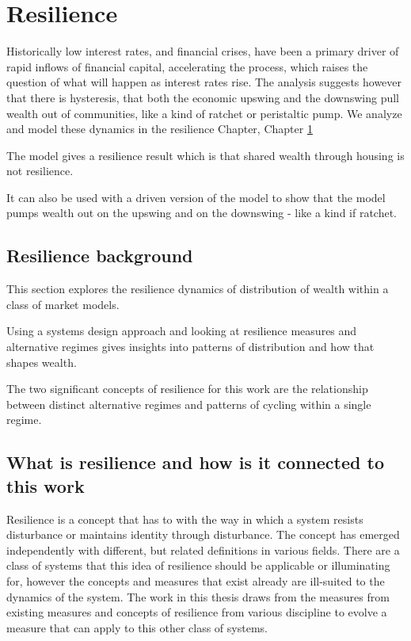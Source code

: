\chapter{Resilience} \label{chapter-resilience}

Historically low interest rates, and financial crises, have been a primary driver of rapid inflows of financial capital, accelerating the process, which raises the question of what will happen as interest rates rise. The analysis suggests however that there is hysteresis, that both the economic upswing and the downswing pull wealth out of communities, like a kind of ratchet or peristaltic pump. We analyze and model these dynamics in the resilience Chapter, Chapter \ref{chapter-resilience}


The model gives a resilience result which is that shared wealth through housing is not resilience.

It can also be used with a driven version of the model to show that the model pumps wealth out on the upswing and on the downswing - like a kind if ratchet.



\section{Resilience background}

This section explores the resilience dynamics of distribution of wealth within a class of market models.  

Using a systems design approach and looking at resilience measures and alternative regimes gives insights into patterns of distribution and how that shapes wealth. 

The two significant concepts of resilience for this work are the relationship between distinct alternative regimes and patterns of cycling within a single regime. 

\section{What is resilience and how is it connected to this work}

Resilience is a concept that has to with the way in which a system resists disturbance or maintains identity through disturbance. The concept has emerged independently with different, but related definitions in various fields. 
There are a class of systems that this idea of resilience should be applicable or illuminating for, however the concepts and measures that exist already are ill-suited to the dynamics of the system. 
The work in this thesis draws from the measures from existing measures and concepts of resilience from various discipline to evolve a measure that can apply to this other class of systems. 

